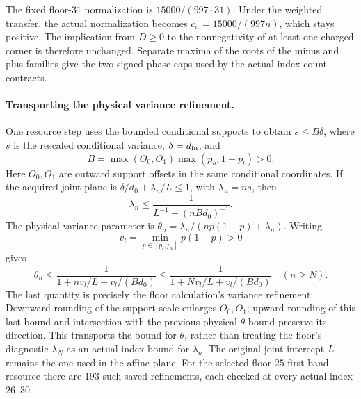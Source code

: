 The fixed floor-$31$ normalization is $15000/(997\cdot31)$.
Under the weighted transfer, the actual normalization becomes
$c_n=15000/(997n)$, which stays positive. The implication from
$D\ge0$ to the nonnegativity of at least one charged corner is
therefore unchanged. Separate maxima of the roots of the minus and
plus families give the two signed phase caps used by the actual-index
count contracts.

\paragraph{Transporting the physical variance refinement.}
One resource step uses the bounded conditional supports to obtain
$s\le B\delta$, where $s$ is the rescaled conditional variance,
$\delta=d_{\rm in}$, and
\[
 B=\max(O_0,O_1)\max(p_u,1-p_l)>0.
\]
Here $O_0,O_1$ are outward support offsets in the same conditional
coordinates. If the acquired joint plane is
$\delta/d_0+\lambda_n/L\le1$, with $\lambda_n=ns$, then
\[
 \lambda_n\le \frac{1}{L^{-1}+(nBd_0)^{-1}}.
\]
The physical variance parameter is
$\theta_n=\lambda_n/(n p(1-p)+\lambda_n)$. Writing
\[
 v_l=\min_{p\in[p_l,p_u]}p(1-p)>0
\]
gives
\[
 \theta_n\le
 \frac{1}{1+n v_l/L+v_l/(Bd_0)}
 \le \frac{1}{1+N v_l/L+v_l/(Bd_0)}
 \quad(n\ge N).
\]
The last quantity is precisely the floor calculation's variance
refinement. Downward rounding of the support scale enlarges $O_0,O_1$;
upward rounding of this last bound and intersection with the previous
physical $\theta$ bound preserve its direction. This transports the
bound for $\theta$, rather than treating the floor's diagnostic
$\lambda_N$ as an actual-index bound for $\lambda_n$.
The original joint intercept $L$ remains the one used in the affine
plane. For the selected floor-$25$ first-band resource there are $193$
such saved refinements, each checked at every actual index $26$--$30$.


